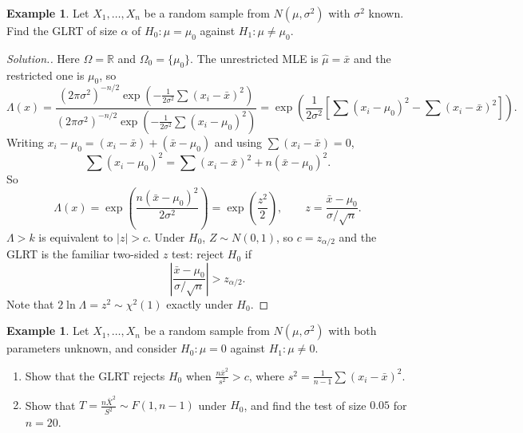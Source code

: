 \documentclass[12pt,a4paper]{report}
\theoremstyle{definition}
\newtheorem{example}[thm]{Example}
\theoremstyle{plain}
\newenvironment{solution}
  {\renewcommand{\qedsymbol}{}\begin{proof}[\textit{Solution}.]}
  {\end{proof}}
\begin{document}
\begin{example}
\label{ex:glrtztest}
Let $X_1,\dots,X_n$ be a random sample from $N(\mu,\sigma^2)$ with $\sigma^2$
known. Find the GLRT of size $\alpha$ of $H_0\colon\mu = \mu_0$ against
$H_1\colon\mu\ne\mu_0$.
\end{example}

\begin{solution}
Here $\Omega = \mathbb{R}$ and $\Omega_0 = \{\mu_0\}$. The unrestricted MLE is
$\hat\mu = \bar x$ and the restricted one is $\mu_0$, so
\[\Lambda(x) = \frac{(2\pi\sigma^2)^{-n/2}\exp\left(-\frac{1}{2\sigma^2}\sum(x_i - \bar x)^2\right)}
{(2\pi\sigma^2)^{-n/2}\exp\left(-\frac{1}{2\sigma^2}\sum(x_i - \mu_0)^2\right)}
= \exp\left(\frac{1}{2\sigma^2}\left[\sum(x_i - \mu_0)^2 - \sum(x_i - \bar x)^2\right]\right).\]
Writing $x_i - \mu_0 = (x_i - \bar x) + (\bar x - \mu_0)$ and using
$\sum(x_i - \bar x) = 0$,
\begin{equation}
\label{eq:sumsquaressplit}
\sum(x_i - \mu_0)^2 = \sum(x_i - \bar x)^2 + n(\bar x - \mu_0)^2 .
\end{equation}
So
\[\Lambda(x) = \exp\left(\frac{n(\bar x - \mu_0)^2}{2\sigma^2}\right)
= \exp\left(\frac{z^2}{2}\right),\qquad z = \frac{\bar x - \mu_0}{\sigma/\sqrt n} .\]
$\Lambda>k$ is equivalent to $|z|>c$. Under $H_0$, $Z\sim N(0,1)$, so
$c = z_{\alpha/2}$ and the GLRT is the familiar two-sided $z$ test: reject $H_0$ if
\[\left|\frac{\bar x - \mu_0}{\sigma/\sqrt n}\right|>z_{\alpha/2} .\]
Note that $2\ln\Lambda = z^2\sim\chi^2(1)$ exactly under $H_0$.
\end{solution}

\begin{example}
\label{ex:glrtttest}
Let $X_1,\dots,X_n$ be a random sample from $N(\mu,\sigma^2)$ with both parameters
unknown, and consider $H_0\colon\mu = 0$ against $H_1\colon\mu\ne 0$.
\begin{enumerate}
\item[(a)] Show that the GLRT rejects $H_0$ when $\frac{n\bar x^2}{s^2}>c$, where
$s^2 = \frac{1}{n-1}\sum(x_i - \bar x)^2$.
\item[(b)] Show that $T = \frac{n\bar X^2}{S^2}\sim F(1,n-1)$ under $H_0$, and
find the test of size $0.05$ for $n = 20$.
\end{enumerate}
\end{example}
\end{document}
